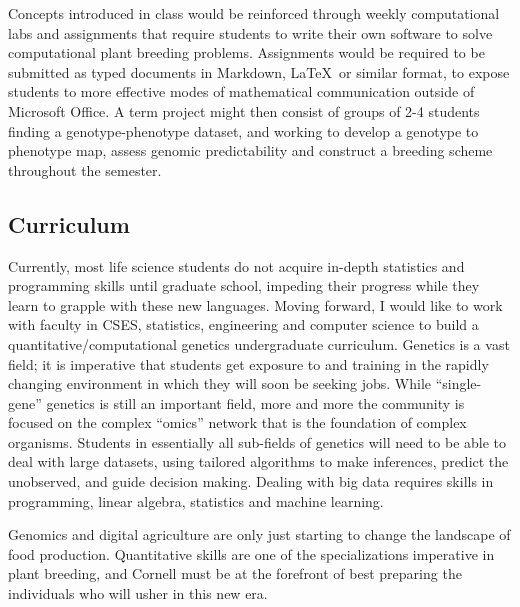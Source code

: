 \documentclass[11pt]{article}
\begin{document}
Concepts introduced in class would be reinforced through weekly computational labs and assignments that require students to write their own software to solve computational plant breeding problems. Assignments would be required to be submitted as typed documents in Markdown, \LaTeX\ or similar format, to expose students to more effective modes of mathematical communication outside of Microsoft Office. A term project might then consist of groups of 2-4 students finding a genotype-phenotype dataset, and working to develop a genotype to phenotype map, assess genomic predictability and construct a breeding scheme throughout the semester. 


\subsection*{Curriculum}

Currently, most life science students do not acquire in-depth statistics and programming skills until graduate school, impeding their progress while they learn to grapple with these new languages. Moving forward, I would like to work with faculty in CSES, statistics, engineering and computer science to build a quantitative/computational genetics undergraduate curriculum. Genetics is a vast field; it is imperative that students get exposure to and training in the rapidly changing environment in which they will soon be seeking jobs. While ``single-gene'' genetics is still an important field, more and more the community is focused on the complex ``omics'' network that is the foundation of complex organisms. Students in essentially all sub-fields of genetics will need to be able to deal with large datasets, using tailored algorithms to make inferences, predict the unobserved, and guide decision making. Dealing with big data requires skills in programming, linear algebra, statistics and machine learning. 



Genomics and digital agriculture are only just starting to change the landscape of food production. Quantitative skills are one of the specializations imperative in plant breeding, and Cornell must be at the forefront of best preparing the individuals who will usher in this new era.
\end{document}
